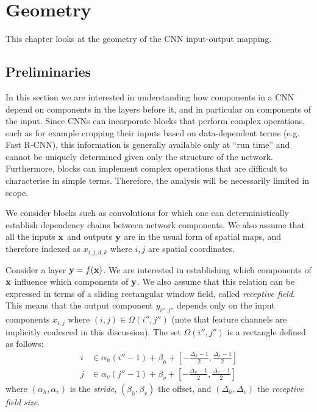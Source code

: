 \chapter{Geometry}\label{s:geometry}

This chapter looks at the geometry of the CNN input-output mapping.

\section{Preliminaries}\label{s:preliminaries}

In this section we are interested in understanding how components in a CNN depend on components in the layers before it, and in particular on components of the input.  Since CNNs can incorporate blocks that perform complex operations, such as for example cropping their inputs based on data-dependent terms (e.g. Fast R-CNN), this information is generally available only at ``run time'' and cannot be uniquely determined given only the structure of the network. Furthermore, blocks can implement complex operations that are difficult to characterise in simple terms. Therefore, the analysis will be necessarily limited in scope.

We consider blocks such as convolutions for which one can deterministically establish dependency chains between network components. We also assume that all the inputs $\mathbf{x}$ and outputs $\mathbf{y}$ are in the usual form of spatial maps, and therefore indexed as $x_{i,j,d,k}$ where $i,j$ are spatial coordinates.

Consider a layer $\mathbf{y} = f(\mathbf{x})$. We are interested in establishing which components of $\mathbf{x}$ influence which components of $\mathbf{y}$. We also assume that this relation can be expressed in terms of a sliding rectangular window field, called \emph{receptive field}. This means that the output component  $y_{i'', j''}$ depends only on the input components $x_{i,j}$ where $(i,j) \in \Omega(i'', j'') $ (note that feature channels are implicitly coalesced in this discussion). The set $\Omega(i'',j'')$ is a rectangle defined as follows:
\begin{align}\label{e:receptive}
     i &\in \alpha_h (i'' -1) + \beta_h + \left[- \frac{\Delta_h-1}{2}, \frac{\Delta_h-1}{2}\right] \\
     j &\in \alpha_v (j'' -1) + \beta_v + \left[- \frac{\Delta_v-1}{2}, \frac{\Delta_v-1}{2}\right]
\end{align}
where $(\alpha_h,\alpha_v)$ is the \emph{stride}, $(\beta_h,\beta_v)$ the offset, and $(\Delta_h, \Delta_v)$ the \emph{receptive field size}.

